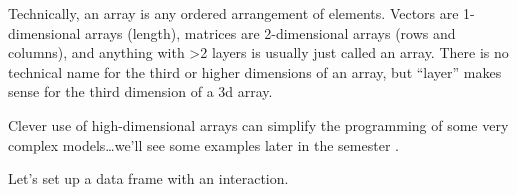 \documentclass[
  13,
  letterpaper,
]{report}
\newenvironment{Shaded}{\begin{snugshade}}{\end{snugshade}}
\newcommand{\AttributeTok}[1]{\textcolor[rgb]{0.40,0.45,0.13}{#1}}
\newcommand{\CommentTok}[1]{\textcolor[rgb]{0.37,0.37,0.37}{#1}}
\newcommand{\ConstantTok}[1]{\textcolor[rgb]{0.56,0.35,0.01}{#1}}
\newcommand{\ControlFlowTok}[1]{\textcolor[rgb]{0.00,0.23,0.31}{\textbf{#1}}}
\newcommand{\DecValTok}[1]{\textcolor[rgb]{0.68,0.00,0.00}{#1}}
\newcommand{\FunctionTok}[1]{\textcolor[rgb]{0.28,0.35,0.67}{#1}}
\newcommand{\NormalTok}[1]{\textcolor[rgb]{0.00,0.23,0.31}{#1}}
\newcommand{\OtherTok}[1]{\textcolor[rgb]{0.00,0.23,0.31}{#1}}
\newcommand{\SpecialCharTok}[1]{\textcolor[rgb]{0.37,0.37,0.37}{#1}}
\newcommand{\StringTok}[1]{\textcolor[rgb]{0.13,0.47,0.30}{#1}}
\begin{document}
Technically, an array is any ordered arrangement of elements. Vectors
are 1-dimensional arrays (length), matrices are 2-dimensional arrays
(rows and columns), and anything with \textgreater2 layers is usually
just called an array. There is no technical name for the third or higher
dimensions of an array, but ``layer'' makes sense for the third
dimension of a 3d array.

Clever use of high-dimensional arrays can simplify the programming of
some very complex models\ldots we'll see some examples later in the
semester .

Let's set up a data frame with an interaction.

\begin{Shaded}
\end{Shaded}
\end{document}
